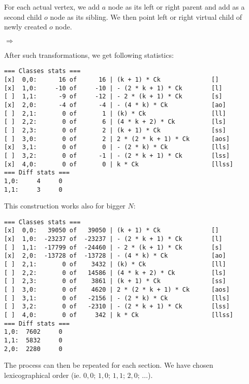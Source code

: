 \documentclass[final]{article}
\theoremstyle{definition}
\theoremstyle{remark}
\newcommand{\includeinlinesvg}[2]{\begin{minipage}{#1\textwidth}\end{minipage}}
\begin{document}
For each actual vertex, we add \(a\) node as its left or right parent and add as a second child \(o\) node as its sibling. We then point left or right virtual child of newly created \(o\) node.

\includeinlinesvg{.20}{trees_200__0_base}%
\(\Rightarrow\)
\includeinlinesvg{.20}{trees_200__0}%
\includeinlinesvg{.20}{trees_201__0}%
\includeinlinesvg{.20}{trees_202__0}%
\includeinlinesvg{.20}{trees_203__0}%

After such transformations, we get following statistics:

\begin{lstlisting}
=== Classes stats ===
[x]  0,0:      16 of      16 | (k + 1) * Ck              []
[x]  1,0:     -10 of     -10 | - (2 * k + 1) * Ck        [l]
[ ]  1,1:      -9 of     -12 | - 2 * (k + 1) * Ck        [s]
[x]  2,0:      -4 of      -4 | - (4 * k) * Ck            [ao]
[ ]  2,1:       0 of       1 | (k) * Ck                  [ll]
[ ]  2,2:       0 of       6 | (4 * k + 2) * Ck          [ls]
[ ]  2,3:       0 of       2 | (k + 1) * Ck              [ss]
[ ]  3,0:       0 of       2 | 2 * (2 * k + 1) * Ck      [aos]
[x]  3,1:       0 of       0 | - (2 * k) * Ck            [lls]
[ ]  3,2:       0 of      -1 | - (2 * k + 1) * Ck        [lss]
[x]  4,0:       0 of       0 | k * Ck                    [llss]
=== Diff stats ===
1,0:     4     0
1,1:     3     0
\end{lstlisting}

This construction works also for bigger \(N\):

\begin{lstlisting}
=== Classes stats ===
[x]  0,0:   39050 of   39050 | (k + 1) * Ck              []
[x]  1,0:  -23237 of  -23237 | - (2 * k + 1) * Ck        [l]
[ ]  1,1:  -17799 of  -24460 | - 2 * (k + 1) * Ck        [s]
[x]  2,0:  -13728 of  -13728 | - (4 * k) * Ck            [ao]
[ ]  2,1:       0 of    3432 | (k) * Ck                  [ll]
[ ]  2,2:       0 of   14586 | (4 * k + 2) * Ck          [ls]
[ ]  2,3:       0 of    3861 | (k + 1) * Ck              [ss]
[ ]  3,0:       0 of    4620 | 2 * (2 * k + 1) * Ck      [aos]
[ ]  3,1:       0 of   -2156 | - (2 * k) * Ck            [lls]
[ ]  3,2:       0 of   -2310 | - (2 * k + 1) * Ck        [lss]
[ ]  4,0:       0 of     342 | k * Ck                    [llss]
=== Diff stats ===
1,0:  7602     0
1,1:  5832     0
2,0:  2280     0
\end{lstlisting}

The process can then be repeated for each section. We have chosen lexicographical order (ie. \(0,0\); \(1,0\); \(1,1\); \(2,0\); \(\ldots\)).
\end{document}
